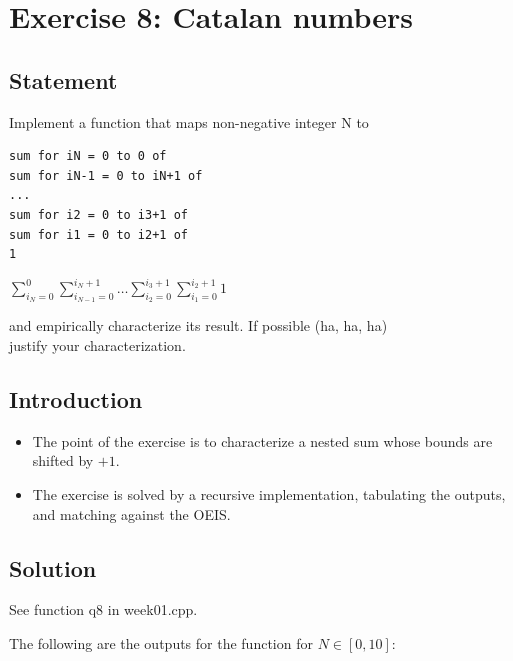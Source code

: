 \documentclass[12pt]{article}
\begin{document}

\newpage

\section{Exercise 8: Catalan numbers}


\subsection{Statement}

Implement a function that maps non-negative integer N to

\begin{verbatim}
sum for iN = 0 to 0 of
sum for iN-1 = 0 to iN+1 of
...
sum for i2 = 0 to i3+1 of
sum for i1 = 0 to i2+1 of
1
\end{verbatim}

$\displaystyle\sum_{i_{N}=0}^{0}\sum_{i_{N-1}=0}^{i_{N}+1}\dots\sum_{i_{2}=0}^{i_{3}+1}\sum_{i_{1}=0}^{i_{2}+1}1$

and empirically characterize its result. If possible (ha, ha, ha) \\ justify your
characterization.


\subsection{Introduction}

\begin{itemize}

\item
  The point of the exercise is to characterize a nested sum whose bounds are shifted by $+1$.

\item
  The exercise is solved by a recursive implementation, tabulating the outputs, and matching against the OEIS.

\end{itemize}


\subsection{Solution}

See function q8 in week01.cpp.

The following are the outputs for the function for $N \in [0,10]$:
\end{document}
